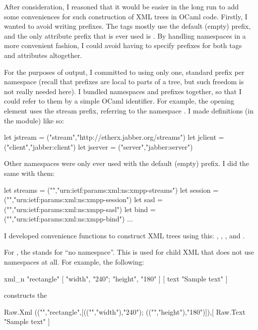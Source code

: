 \documentclass[12pt,a4paper,twoside,openright]{report}
\begin{document}
{After consideration, I reasoned that it would be easier in the long run to add some conveniences for such construction of XML trees in OCaml code. Firstly, I wanted to avoid writing prefixes. The tags mostly use the default (empty) prefix, and the only attribute prefix that is ever used is . By handling namespaces in a more convenient fashion, I could avoid having to specify prefixes for both tags and attributes altogether.

For the purposes of output, I committed to using only one, standard prefix per namespace (recall that prefixes are local to parts of a tree, but such freedom is not really needed here). I bundled namespaces and prefixes together, so that I could refer to them by a simple OCaml identifier. For example, the opening  element uses the stream prefix, referring to the namespace . I made definitions (in the  module) like so:

\begin{ocaml}
let jstream  = ("stream","http://etherx.jabber.org/streams")
let jclient  = ("client","jabber:client")
let jserver  = ("server","jabber:server")
\end{ocaml}

Other namespaces were only ever used with the default (empty) prefix. I did the same with them:

\begin{ocaml}
let streams = ("","urn:ietf:params:xml:ns:xmpp-streams")
let session = ("","urn:ietf:params:xml:ns:xmpp-session")
let sasl    = ("","urn:ietf:params:xml:ns:xmpp-sasl")
let bind    = ("","urn:ietf:params:xml:ns:xmpp-bind")
...
\end{ocaml}

I developed convenience functions to construct XML trees using this: , , , and .

For , the  stands for ``no namespace''. This is used for child XML that does not use namespaces at all. For example, the following:
\begin{ocaml}
xml_n "rectangle" [ "width", "240"; "height", "180" ] [
  text "Sample text"
]
\end{ocaml} constructs the 
\begin{ocaml}
Raw.Xml (("","rectangle",[(("","width"),"240"); (("","height"),"180")]),[
  Raw.Text "Sample text"
]
\end{ocaml}

}
\end{document}

